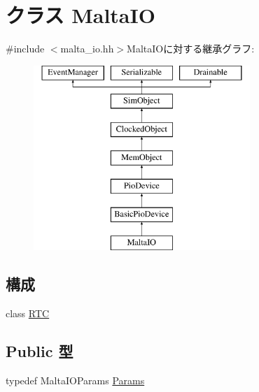 \hypertarget{classMaltaIO}{
\section{クラス MaltaIO}
\label{classMaltaIO}
}


{\ttfamily \#include $<$malta\_\-io.hh$>$}MaltaIOに対する継承グラフ:\begin{figure}[H]
\begin{center}
\leavevmode
\includegraphics[height=7cm]{classMaltaIO}
\end{center}
\end{figure}
\subsection*{構成}
\begin{DoxyCompactItemize}
\item 
class \hyperlink{classMaltaIO_1_1RTC}{RTC}
\end{DoxyCompactItemize}
\subsection*{Public 型}
\begin{DoxyCompactItemize}
\item 
typedef MaltaIOParams \hyperlink{classMaltaIO_a67250d5117f4f6705cea74a7a228ccf0}{Params}
\end{DoxyCompactItemize}
